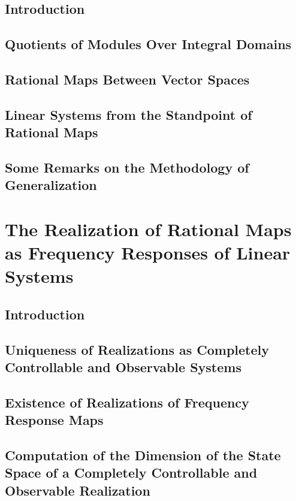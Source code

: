 \documentclass[12pt]{book}
\theoremstyle{plain}
\theoremstyle{definition}
\begin{document}
\section{Introduction}

\section{Quotients of Modules Over Integral Domains}

\section{Rational Maps Between Vector Spaces}

\section{Linear Systems from the Standpoint of Rational Maps}

\section{Some Remarks on the Methodology of Generalization}

\chapter{The Realization of Rational Maps as Frequency Responses of Linear Systems}

\section{Introduction}

\section{Uniqueness of Realizations as Completely Controllable and Observable Systems}

\section{Existence of Realizations of Frequency Response Maps}

\section{Computation of the Dimension of the State Space of a Completely Controllable and Observable Realization}
\end{document}

